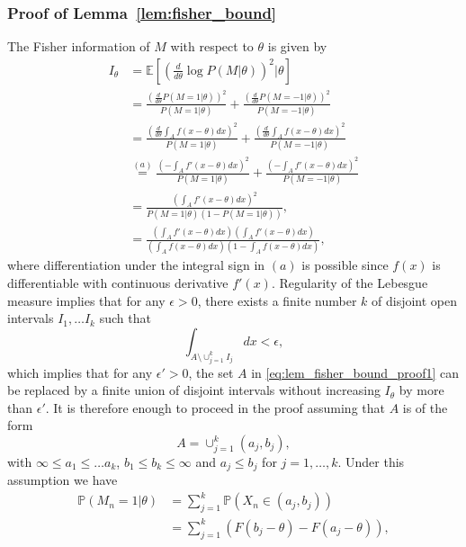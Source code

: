 \documentclass[letterpaper, conference, 11pt]{IEEEtran}      %
\begin{document}
\subsubsection*{Proof of Lemma~\ref{lem:fisher_bound}}
The Fisher information of $M$ with respect to $\theta$ is given by
\begin{align}
I_\theta & =  \mathbb E \left[ \left( \frac{d}{d\theta} \log P\left( M | \theta \right) \right)^2 |\theta \right] \nonumber \\
& = \frac{ \left(\frac{d}{d\theta} P(M=1|\theta) \right)^2}{P(M=1| \theta)} + \frac{ \left(\frac{d}{d\theta} P(M=-1|\theta) \right)^2} {P(M=-1| \theta)} \nonumber \\
& =  \frac{ \left( \frac{d}{d\theta} \int_A f \left( x-\theta\right)dx \right)^2} { P(M=1| \theta) } + \frac{ \left( \frac{d}{d\theta}\int_A f \left( x-\theta \right)dx \right)^2} { P(M=-1| \theta) } \nonumber \\ 
& \overset{(a)}{=} \frac{ \left( - \int_A f' \left( x-\theta \right)dx \right)^2} { P(M=1| \theta) } + \frac{ \left(- \int_A f' \left( x-\theta \right)dx \right)^2} { P(M=-1| \theta) } \nonumber \\ 
& = \frac{\left( \int_A f'\left( x-\theta \right) dx \right)^2 }{  P(M=1 | \theta) \left(1-P(M=1|\theta) \right)  }, \nonumber \\
& = \frac{\left( \int_A f'\left( x-\theta \right) dx \right) \left( \int_A f'\left( x-\theta \right) dx \right)}{ \left( \int_A f \left( x-\theta \right) dx \right)  \left(1- \int_A f \left( x-\theta \right) dx \right) }, \label{eq:lem_fisher_bound_proof1}
\end{align}
where differentiation under the integral sign in $(a)$ is possible since $f(x)$ is differentiable with continuous derivative $f'(x)$. Regularity of the Lebesgue measure implies that for any $\epsilon>0$, there exists a finite number $k$ of disjoint open intervals $I_1,\ldots I_k$ such that 
\[
\int_{A\setminus \cup_{j=1}^k I_j }  dx < \epsilon,
\]
which implies that for any $\epsilon' > 0$, the set $A$ in \eqref{eq:lem_fisher_bound_proof1} can be replaced by a finite union of disjoint intervals without increasing $I_\theta$ by more than $\epsilon'$. It is therefore enough to proceed in the proof assuming that $A$ is of the form
\[
A = \cup_{j=1}^k (a_j,b_j),
\]
with $\infty \leq a_1 \leq \ldots a_k$, $b_1 \leq b_k \leq \infty$ and $a_j \leq b_j$ for $j=1,\ldots,k$. Under this assumption we have
\begin{align*}
\mathbb P(M_n=1| \theta) & = \sum_{j=1}^k \mathbb P\left(X_n \in (a_j,b_j) \right)  \\
& = \sum_{j=1}^k \left( F \left(b_j-\theta\right) -  F \left(a_j-\theta\right)  \right),
\end{align*}
\end{document}
